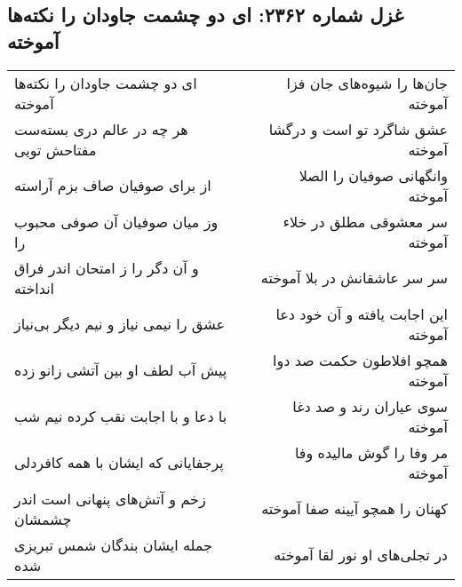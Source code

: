 \begin{center}
\section*{غزل شماره ۲۳۶۲: ای دو چشمت جاودان را نکته‌ها آموخته}
\label{sec:2362}
\begin{longtable}{l p{0.5cm} r}
ای دو چشمت جاودان را نکته‌ها آموخته
&&
جان‌ها را شیوه‌های جان فزا آموخته
\\
هر چه در عالم دری بسته‌ست مفتاحش تویی
&&
عشق شاگرد تو است و درگشا آموخته
\\
از برای صوفیان صاف بزم آراسته
&&
وانگهانی صوفیان را الصلا آموخته
\\
وز میان صوفیان آن صوفی محبوب را
&&
سر معشوقی مطلق در خلاء آموخته
\\
و آن دگر را ز امتحان اندر فراق انداخته
&&
سر سر عاشقانش در بلا آموخته
\\
عشق را نیمی نیاز و نیم دیگر بی‌نیاز
&&
این اجابت یافته و آن خود دعا آموخته
\\
پیش آب لطف او بین آتشی زانو زده
&&
همچو افلاطون حکمت صد دوا آموخته
\\
با دعا و با اجابت نقب کرده نیم شب
&&
سوی عیاران رند و صد دغا آموخته
\\
پرجفایانی که ایشان با همه کافردلی
&&
مر وفا را گوش مالیده وفا آموخته
\\
زخم و آتش‌های پنهانی است اندر چشمشان
&&
کهنان را همچو آیینه صفا آموخته
\\
جمله ایشان بندگان شمس تبریزی شده
&&
در تجلی‌های او نور لقا آموخته
\\
\end{longtable}
\end{center}
